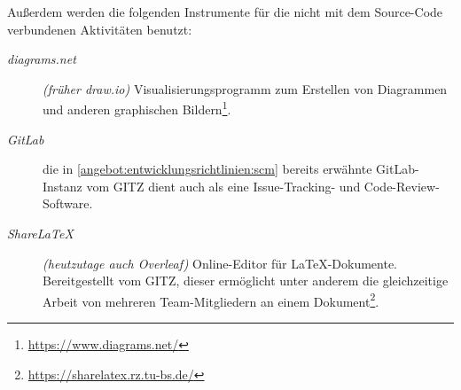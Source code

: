 \documentclass{article}
\begin{document}
Außerdem werden die folgenden Instrumente für die nicht mit dem Source-Code verbundenen Aktivitäten benutzt:

\begin{description}
    \item [\textit{diagrams.net}] \textit{(früher draw.io)} Visualisierungsprogramm zum Erstellen von Diagrammen und anderen graphischen Bildern\footnote{\url{https://www.diagrams.net/}}.
    \item [\textit{GitLab}] die in \ref{angebot:entwicklungsrichtlinien:scm} bereits erwähnte GitLab-Instanz vom GITZ dient auch als eine Issue-Tracking- und Code-Review-Software.
    \item [\textit{ShareLaTeX}] \textit{(heutzutage auch Overleaf)} Online-Editor für \LaTeX-Dokumente. Bereitgestellt vom GITZ, dieser ermöglicht unter anderem die gleichzeitige Arbeit von mehreren Team-Mitgliedern an einem Dokument\footnote{\url{https://sharelatex.rz.tu-bs.de/}}.
\end{description}
\end{document}
